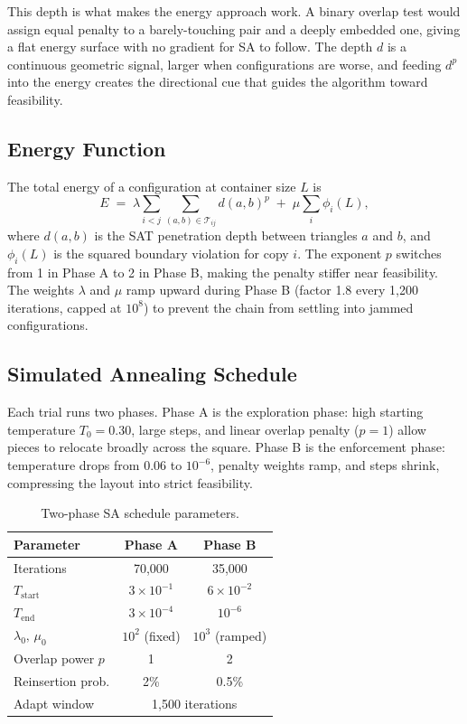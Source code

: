 \documentclass[10pt,twocolumn]{article}
\begin{document}
This depth is what makes the energy approach work. A binary overlap
test would assign equal penalty to a barely-touching pair and a deeply
embedded one, giving a flat energy surface with no gradient for SA to
follow. The depth $d$ is a continuous geometric signal, larger when
configurations are worse, and feeding $d^p$ into the energy creates the
directional cue that guides the algorithm toward feasibility.

\subsection{Energy Function}

The total energy of a configuration at container size $L$ is
\begin{equation}
  E \;=\; \lambda\!\sum_{i<j}\sum_{(a,b)\in\mathcal{T}_{ij}}
  d(a,b)^{p}
  \;+\; \mu\sum_{i}\phi_i(L),
  \label{eq:energy}
\end{equation}
where $d(a,b)$ is the SAT penetration depth between triangles $a$
and $b$, and $\phi_i(L)$ is the squared boundary violation for copy $i$.
The exponent $p$ switches from 1 in Phase A to 2 in Phase B, making the
penalty stiffer near feasibility. The weights $\lambda$ and $\mu$ ramp
upward during Phase B (factor 1.8 every 1{,}200 iterations, capped at
$10^8$) to prevent the chain from settling into jammed configurations.

\subsection{Simulated Annealing Schedule}

Each trial runs two phases. Phase A is the exploration phase: high
starting temperature $T_0 = 0.30$, large steps, and linear overlap
penalty ($p=1$) allow pieces to relocate broadly across the square.
Phase B is the enforcement phase: temperature drops from 0.06 to
$10^{-6}$, penalty weights ramp, and steps shrink, compressing the
layout into strict feasibility.

\begin{table}[t]
\centering
\small
\caption{Two-phase SA schedule parameters.}
\label{tab:phases}
\setlength{\tabcolsep}{4pt}
\begin{tabular}{lcc}
\toprule
Parameter & Phase A & Phase B \\
\midrule
Iterations            & 70{,}000        & 35{,}000 \\
$T_{\mathrm{start}}$  & $3\times10^{-1}$& $6\times10^{-2}$ \\
$T_{\mathrm{end}}$    & $3\times10^{-4}$& $10^{-6}$        \\
$\lambda_0,\,\mu_0$   & $10^{2}$ (fixed)& $10^{3}$ (ramped)\\
Overlap power $p$     & 1               & 2 \\
Reinsertion prob.     & 2\%             & 0.5\% \\
Adapt window          & \multicolumn{2}{c}{1{,}500 iterations} \\
\bottomrule
\end{tabular}
\end{table}
\end{document}
